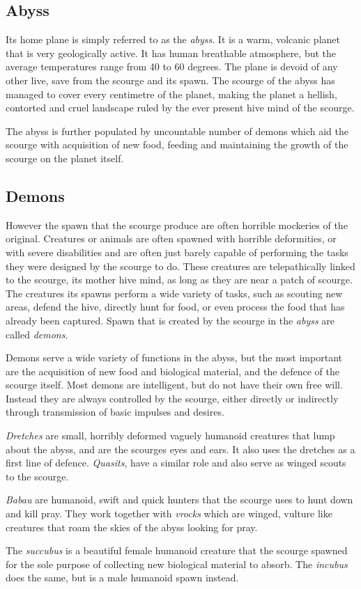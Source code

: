 \subsection{Abyss}
\label{sec:Abyss}

Its home plane is simply referred to as the \emph{abyss}. It is a warm,
volcanic planet that is very geologically active. It has human breathable
atmosphere, but the average temperatures range from 40 to 60 degrees. The
plane is devoid of any other live, save from the scourge and its spawn. The
scourge of the abyss has managed to cover every centimetre of the planet,
making the planet a hellish, contorted and cruel landscape ruled by the ever
present hive mind of the scourge.

The abyss is further populated by uncountable number of demons which aid
the scourge with acquisition of new food, feeding and maintaining the growth
of the scourge on the planet itself.

\subsection{Demons}
\label{sec:Demons}

However the spawn that the scourge produce are often horrible mockeries of the
original. Creatures or animals are often spawned with horrible deformities,
or with severe disabilities and are often just barely capable of performing
the tasks they were designed by the scourge to do. These creatures are
telepathically linked to the scourge, its mother hive mind, as long as they
are near a patch of scourge. The creatures its spawns perform a wide variety
of tasks, such as scouting new areas, defend the hive, directly hunt for food,
or even process the food that has already been captured. Spawn that is created
by the scourge in the \emph{abyss} are called \emph{demons}.

Demons serve a wide variety of functions in the abyss, but the most important
are the acquisition of new food and biological material, and the defence of
the scourge itself. Most demons are intelligent, but do not have their own
free will. Instead they are always controlled by the scourge, either directly
or indirectly through transmission of basic impulses and desires.

\emph{Dretches} are small, horribly deformed vaguely humanoid creatures that
lump about the abyss, and are the scourges eyes and ears. It also uses the
dretches as a first line of defence. \emph{Quasits}, have a similar role and
also serve as winged scouts to the scourge.

\emph{Babau} are humanoid, swift and quick hunters that the scourge uses to
hunt down and kill pray. They work together with \emph{vrocks} which are
winged, vulture like creatures that roam the skies of the abyss looking for
pray.

The \emph{succubus} is a beautiful female humanoid creature that the scourge
spawned for the sole purpose of collecting new biological material to absorb.
The \emph{incubus} does the same, but is a male humanoid spawn instead.
